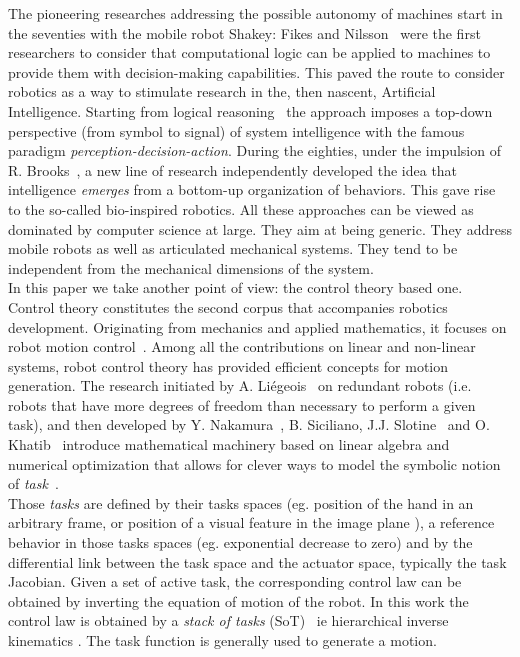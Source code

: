 \documentclass[letterpaper, 10pt, conference]{ieeeconf}      %
\begin{document}
The pioneering researches addressing the possible autonomy of machines
start in the seventies with the mobile robot Shakey: Fikes and Nilsson~\cite{fikes71}
were the first researchers to consider that computational logic can be
applied to machines to provide them with decision-making capabilities.
This paved the route to consider robotics as a way to stimulate research
in the, then nascent, Artificial Intelligence. Starting from logical
reasoning~\cite{ghallab04} the approach imposes a top-down perspective (from symbol to
signal) of system intelligence with the famous paradigm
\emph{perception-decision-action}. During the eighties, under the impulsion
of R. Brooks~\cite{brooks86}, a new line of research independently developed the idea
that intelligence \emph{emerges} from a bottom-up organization of behaviors.
This gave rise to the so-called bio-inspired robotics. All these
approaches can be viewed as dominated by computer science at large. They
aim at being generic. They address mobile robots as well as articulated
mechanical systems. They tend to be independent from the mechanical
dimensions of the system.\\

In this paper we take another point of view: the control theory based
one. Control theory constitutes the second corpus that accompanies
robotics development. Originating from mechanics and applied
mathematics, it focuses on robot motion control~\cite{murray94,
siciliano10}. Among all the
contributions on linear and non-linear systems, robot control theory has
provided efficient concepts for motion generation. The research
initiated by A. Li\'egeois~\cite{liegeois77} on redundant robots (i.e. robots that have
more degrees of freedom than necessary to perform a given task), and
then developed by Y. Nakamura~\cite{nakamura91}, B. Siciliano, J.J. Slotine~\cite{siciliano91} and O.
Khatib~\cite{khatib87} introduce mathematical machinery based on linear algebra and
numerical optimization that allows for clever ways to model the symbolic
notion of \emph{task}~\cite{samson91}.\\

Those \emph{tasks} are defined by their tasks spaces (eg. position of the hand
in an arbitrary frame\cite{nakamura86a,khatib87b}, or position of a visual feature in the image
plane \cite{espiau92,hutchinson96a}), a reference behavior in those tasks spaces
(eg. exponential decrease to zero) and by the differential link between
the task space and the actuator space, typically the task Jacobian.
Given a set of active task, the corresponding control law can be
obtained by inverting the equation of motion of the robot. In this work
the control law is obtained by a \emph{stack of tasks}
(SoT)~\cite{mansard07} ie hierarchical inverse kinematics
\cite{siciliano91}. The task function is generally used to generate a motion.\\
\end{document}
